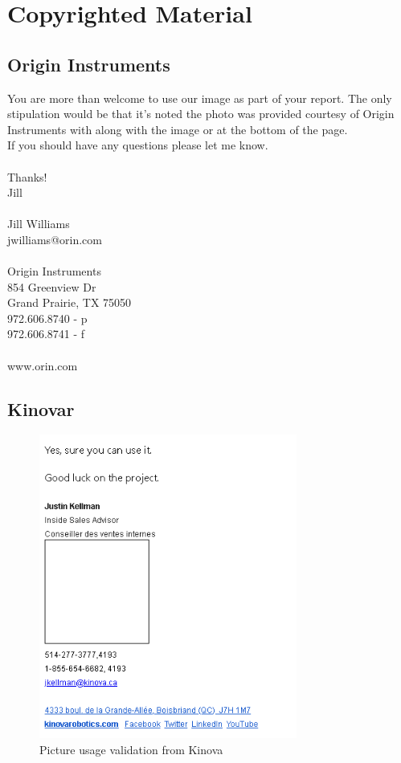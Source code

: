 
\chapter{Copyrighted Material}\label{AppendixA}

\section*{Origin Instruments}\label{st:Origin}
You are more than welcome to use our image as part of your report.  The only stipulation would be that it's noted the photo was provided courtesy of Origin Instruments with along with the image or at the bottom of the page.\\
If you should have any questions please let me know.\\
\\
Thanks!\\
Jill\\
\\
Jill Williams\\
jwilliams@orin.com\\
\\
Origin Instruments\\
854 Greenview Dr\\
Grand Prairie, TX   75050\\
972.606.8740 - p\\
972.606.8741 - f\\
\\ 
www.orin.com\\
\section*{Kinovar}\label{st:KinovaPicture}
\begin{figure}[H]
    \centering
    \includegraphics[width=\textwidth,height=10cm]{Figures/AAU/sebastien.PNG}
    \caption{Picture usage validation from Kinova \cite{Kinova}}
    \label{fig:KinovaPicture}
\end{figure}
